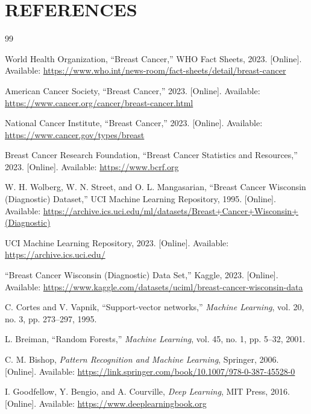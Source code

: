 \documentclass[12pt]{article}
\begin{document}
\newpage
\section{REFERENCES}

\begin{thebibliography}{99}

World Health Organization, ``Breast Cancer,'' WHO Fact Sheets, 2023. [Online]. Available: \url{https://www.who.int/news-room/fact-sheets/detail/breast-cancer}

American Cancer Society, ``Breast Cancer,'' 2023. [Online]. Available: \url{https://www.cancer.org/cancer/breast-cancer.html}

National Cancer Institute, ``Breast Cancer,'' 2023. [Online]. Available: \url{https://www.cancer.gov/types/breast}

Breast Cancer Research Foundation, ``Breast Cancer Statistics and Resources,'' 2023. [Online]. Available: \url{https://www.bcrf.org}

W. H. Wolberg, W. N. Street, and O. L. Mangasarian, ``Breast Cancer Wisconsin (Diagnostic) Dataset,'' UCI Machine Learning Repository, 1995. [Online]. Available: \url{https://archive.ics.uci.edu/ml/datasets/Breast+Cancer+Wisconsin+(Diagnostic)}

UCI Machine Learning Repository, 2023. [Online]. Available: \url{https://archive.ics.uci.edu/}

``Breast Cancer Wisconsin (Diagnostic) Data Set,'' Kaggle, 2023. [Online]. Available: \url{https://www.kaggle.com/datasets/uciml/breast-cancer-wisconsin-data}

C. Cortes and V. Vapnik, ``Support-vector networks,'' \textit{Machine Learning}, vol. 20, no. 3, pp. 273--297, 1995.

L. Breiman, ``Random Forests,'' \textit{Machine Learning}, vol. 45, no. 1, pp. 5--32, 2001.

C. M. Bishop, \textit{Pattern Recognition and Machine Learning}, Springer, 2006. [Online]. Available: \url{https://link.springer.com/book/10.1007/978-0-387-45528-0}

I. Goodfellow, Y. Bengio, and A. Courville, \textit{Deep Learning}, MIT Press, 2016. [Online]. Available: \url{https://www.deeplearningbook.org}


\end{thebibliography}
\end{document}
